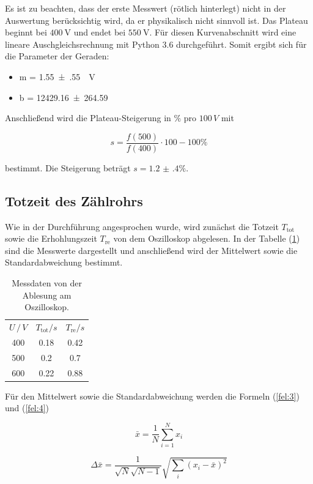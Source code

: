 Es ist zu beachten, dass der erste Messwert (rötlich hinterlegt) nicht in der Auswertung berücksichtig wird,
da er physikalisch nicht sinnvoll ist.
Das Plateau beginnt bei $\SI{400}{\volt}$ und endet bei $\SI{550}{\volt}$.
Für diesen Kurvenabschnitt wird eine lineare Auschgleichsrechnung mit Python 3.6 durchgeführt.
Somit ergibt sich für die Parameter der Geraden:

\begin{itemize}
  \item m = \SI{1.55(55)}{\per\volt}
  \item b = \num{12429.16(26459)}
\end{itemize}

Anschließend wird die Plateau-Steigerung in $\%$ pro $100 \, V$ mit

\begin{equation*}
  s = \frac{f(500)}{f(400)} \cdot 100 - 100 \%
\end{equation*}

bestimmt.
Die Steigerung beträgt $s = \num{1.2(4)} \%$.

\subsection{Totzeit des Zählrohrs}
Wie in der Durchführung angesprochen wurde, wird zunächst die Totzeit $T_\text{tot}$ sowie die Erhohlungszeit $T_\text{re}$ von dem Oszilloskop
abgelesen. In der Tabelle (\ref{tab:2}) sind die Messwerte dargestellt und anschließend wird der Mittelwert sowie die Standardabweichung
bestimmt.
\begin{table}[H]
  \centering
  \caption{Messdaten von der Ablesung am Oszilloskop.}
  \label{tab:2}
  \begin{tabular}{c c c}
    \toprule
    $U \, /\, V$ & $T_\text{tot} / s$ & $T_\text{re} / s$\\
    400 & 0.18 & 0.42\\
    500 & 0.2 & 0.7\\
    600 & 0.22 & 0.88\\
    \bottomrule
  \end{tabular}
\end{table}
Für den Mittelwert sowie die Standardabweichung werden die Formeln (\ref{fel:3}) und (\ref{fel:4})

\begin{equation}
    \bar{x} = \frac{1}{N} \sum_{i=1}^{N} x_i
    \label{fel:3}
\end{equation}

\begin{equation}
  \Delta \bar{x} = \frac{1}{\sqrt{N}\sqrt{N-1}} \sqrt{\sum_{i}(x_i-\bar{x})^2}
  \label{fel:4}
\end{equation}

